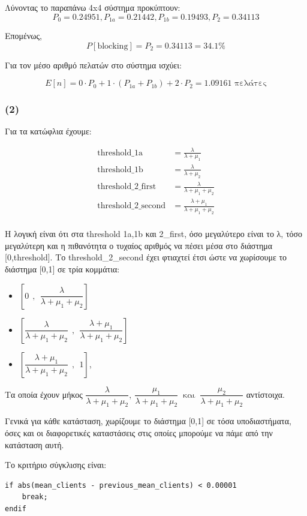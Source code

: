\documentclass[a4paper]{article}
\begin{document}
Λύνοντας το παραπάνω 4x4 σύστημα προκύπτουν: 
\[
	P_0 = 0.24951, P_{1a} = 0.21442, P_{1b} = 0.19493, P_2 = 0.34113
\]

Επομένως, 
\[
	P[\text{blocking}] = P_2 = 0.34113 = 34.1 \%
\]

Για τον μέσο αριθμό πελατών στο σύστημα ισχύει: 

\[
	E[n] = 0 \cdot P_0 + 1 \cdot (P_{1a} + P_{1b}) + 2 \cdot P_2 = 1.09161 \text{ πελάτες}
\]

\subsubsection*{(2)}

Για τα κατώφλια έχουμε: 

\begin{align*}
	\text{threshold\_1a} &= \frac{λ}{λ + μ_1} \\ 
	\text{threshold\_1b} &= \frac{λ}{λ + μ_2} \\
	\text{threshold\_2\_first} &= \frac{λ}{λ + μ_1 + μ_2} \\ 
	\text{threshold\_2\_second} &= \frac{λ+μ_1}{λ + μ_1 + μ_2} \\ 
\end{align*}

Η λογική είναι ότι στα threshold 1a,1b και 2\_first, όσο μεγαλύτερο είναι το λ, τόσο μεγαλύτερη και η πιθανότητα ο τυχαίος αριθμός να πέσει μέσα στο διάστημα [0,threshold]. Το threshold\_2\_second έχει φτιαχτεί έτσι ώστε να χωρίσουμε το διάστημα [0,1] σε τρία κομμάτια: 

\begin{itemize}
	\item $ \left[0\ \ ,\ \ \dfrac{λ}{λ+μ_1+μ_2}\right] $
	\item $ \left[\dfrac{λ}{λ+μ_1+μ_2}\ \ ,\ \ \dfrac{λ+μ_1}{λ+μ_1+μ_2}\right] $
	\item $ \left[\dfrac{λ+μ_1}{λ+μ_1+μ_2}\ \ ,\ \  1\right] $,
\end{itemize}  

Τα οποία έχουν μήκος $ \dfrac{λ}{λ+μ_1+μ_2} ,\ \dfrac{μ_1}{λ+μ_1+μ_2} \ \text{ και }\ \dfrac{μ_2}{λ+μ_1+μ_2}$ αντίστοιχα.

Γενικά για κάθε κατάσταση, χωρίζουμε το διάστημα [0,1] σε τόσα υποδιαστήματα, όσες και οι διαφορετικές καταστάσεις στις οποίες μπορούμε να πάμε από την κατάσταση αυτή.

Το κριτήριο σύγκλισης είναι:

\begin{verbatim} 
if abs(mean_clients - previous_mean_clients) < 0.00001
    break;
endif
\end{verbatim}
\end{document}
